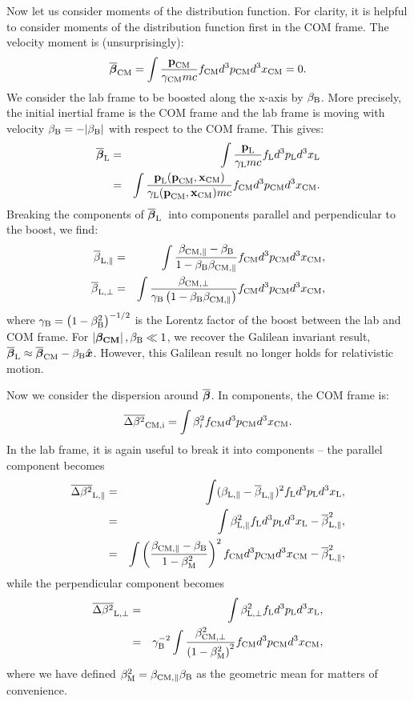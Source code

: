 \documentclass[usenatbib,iop,apj]{emulateapj}
\newcommand\bmath[1] {\mbox{\boldmath$\rm #1$}}
\newcommand{\pmom}{\ensuremath{\bmath{p}}}
\newcommand{\ppos}{\ensuremath{\bmath{x}}}
\newcommand{\fLAB}{\ensuremath{f_{\rm L}}}
\newcommand{\fCM}{\ensuremath{f_{\rm CM}}}
\newcommand{\dVLAB}{\ensuremath{d^3p_{\rm L} d^3x_{\rm L}}}
\newcommand{\dVCM}{\ensuremath{d^3p_{\rm CM} d^3x_{\rm CM}}}
\newcommand{\betaCMpara}{\ensuremath{\beta_{\rm CM,\parallel}}}
\newcommand{\betaCMperp}{\ensuremath{\beta_{\rm CM,\perp}}}
\newcommand{\betaCM}{\ensuremath{\bmath{\beta_{\rm CM}}}}
\newcommand{\betabar}{\ensuremath{\overline{\bmath{\beta}}}}
\newcommand{\betabarLAB}{\ensuremath{\betabar_{\rm L}}}
\newcommand{\betabarCM}{\ensuremath{\betabar_{\rm CM}}}
\newcommand{\betaBOOST}{\ensuremath{\beta_{\rm B}}}
\newcommand{\betabarLABpara}{\ensuremath{\overline{\beta}_{\rm L,\parallel}}}
\newcommand{\betabarLABperp}{\ensuremath{\overline{\beta}_{\rm L,\perp}}}
\newcommand{\dbetabarLABpara}{\ensuremath{\overline{\Delta\beta^2}_{\rm L, \parallel}}}
\newcommand{\dbetabarLABperp}{\ensuremath{\overline{\Delta\beta^2}_{\rm L, \perp}}}
\newcommand{\dbetabarCMi}{\ensuremath{\overline{\Delta\beta^2}_{\rm CM, i}}}
\newcommand{\betaMEAN}{\ensuremath{\beta_{\rm M}}}
\begin{document}
Now let us consider moments of the distribution function.  For clarity, it is helpful to consider moments of the distribution function first in the COM frame.  The velocity moment is (unsurprisingly):
\begin{equation}
 \betabarCM = \int \frac {\pmom_{\rm CM}}{\gamma_{\rm CM} mc} \fCM \dVCM = 0.
\end{equation}
We consider the lab frame to be  boosted along the x-axis by $\betaBOOST$. More precisely, the initial inertial frame is the COM frame and the lab frame is moving with velocity $\betaBOOST = -|\betaBOOST |$ with respect to the COM frame. This gives:
\begin{eqnarray}\label{eq:betabarLAB}
 \betabarLAB &=& \int \frac {\pmom_{\rm L}}{\gamma_{\rm L} mc} \fLAB \dVLAB  \nonumber\\
&=& \int \frac {\pmom_{\rm L}(\pmom_{\rm CM}, \ppos_{\rm CM})}{\gamma_{\rm L}(\pmom_{\rm CM}, \ppos_{\rm CM}) mc} \fCM \dVCM.
\end{eqnarray}
Breaking the components of \betabarLAB\ into components parallel and
perpendicular to the boost, we find: 
\begin{eqnarray}
\betabarLABpara &=& \int \frac{\betaCMpara -\betaBOOST}{1-\betaBOOST\betaCMpara} \fCM \dVCM,\\
\betabarLABperp &=& \int \frac{\betaCMperp}{\gamma_{\rm B}\left(1-\betaBOOST\betaCMpara\right)} \fCM \dVCM,
\end{eqnarray}
where $\gamma_{\rm B} = \left(1-\betaBOOST^2\right)^{-1/2}$ is the Lorentz factor of the boost between the lab and COM frame.  
For $\left|\betaCM\right|,\betaBOOST \ll 1$, we recover the Galilean invariant result, $\betabarLAB \approx \betabarCM - \betaBOOST\hat{\boldsymbol x}$.  
However, this Galilean result no longer holds for relativistic motion.

Now we consider the dispersion around $\betabar$.  In components, the COM frame is:
\begin{equation}
 \dbetabarCMi = \int \beta_i^2 \fCM \dVCM.
\end{equation}
In the lab frame, it is again useful to break it into components -- the parallel component becomes 
\begin{eqnarray}
  \dbetabarLABpara &=& \int (\beta_{\rm L, \parallel}-\betabarLABpara)^2 \fLAB \dVLAB ,\nonumber\\ 
 &=& \int \beta_{\rm L,\parallel}^2 \fLAB \dVLAB - \betabarLABpara^2,\nonumber\\
 &=&\int \left(\frac{\betaCMpara -\betaBOOST}{1-\betaMEAN^2}\right)^2 \fCM \dVCM - \betabarLABpara^2,\label{eq:dbetabarLABpara}
\end{eqnarray}
while the perpendicular component becomes
\begin{eqnarray}
 \dbetabarLABperp &=& \int \beta_{\rm L,\perp}^2 \fLAB \dVLAB, \nonumber\\
&=& \gamma_{\rm B}^{-2} \int \frac{\betaCMperp^2}{\left(1-\betaMEAN^2\right)^2} \fCM \dVCM,
\label{eq:dbetabarLABperp}
\end{eqnarray}
where we have defined $\betaMEAN^2 = \betaCMpara\betaBOOST$ as the geometric mean for matters of convenience.  
\end{document}
